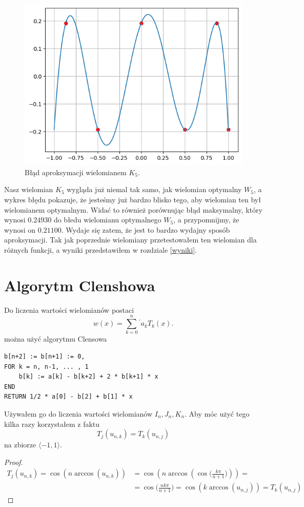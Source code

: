 \documentclass[11pt,wide]{mwart}
\begin{document}
\begin{figure}[H]
	\begin{center}
	\includegraphics[scale=0.7]{blad_K}
	\end{center}
	\caption{Błąd aproksymacji wielomianem $K_5$.}
\end{figure}
Nasz wielomian $K_5$ wygląda już niemal tak samo, jak wielomian optymalny $W_5$, a wykres błędu pokazuje, że jesteśmy już bardzo blisko tego, aby wielomian ten był wielomianem optymalnym. Widać to również porównując błąd maksymalny, który wynosi $0.24930$ do błedu wielomianu optymalnego $W_5$, a przypomnijmy, że wynosi on $0.21100$. Wydaje się zatem, że jest to bardzo wydajny sposób aproksymacji. Tak jak poprzednie wielomiany przetestowałem ten wielomian dla różnych funkcji, a wyniki przedstawiłem w rozdziale \ref{wyniki}.


\section{Algorytm Clenshowa}
Do liczenia wartości wielomianów postaci
$$ w(x) = \sum_{k=0}^n {}^{'} a_k T_k(x). $$
można użyć algorytmu Clensowa \cite{c1}
\begin{verbatim}
b[n+2] := b[n+1] := 0,
FOR k = n, n-1, ... , 1
    b[k] := a[k] - b[k+2] + 2 * b[k+1] * x
END
RETURN 1/2 * a[0] - b[2] + b[1] * x
\end{verbatim}
Używałem go do liczenia wartości wielomianów $I_n, J_n, K_n$. Aby móc użyć tego kilka razy korzystałem z faktu
\begin{equation}
T_j(u_{n, k}) = T_k(u_{n,j})
\end{equation}
na zbiorze $\langle -1, 1 \rangle$.
\begin{proof}
\begin{align*}
T_j(u_{n,k}) = \cos(n \arccos(u_{n,k})) &= \cos(n \arccos(\cos\Big(\frac{k\pi}{n+1}\Big))) = \\
&= \cos\Big(\frac{nk\pi}{n+1}\Big) = \cos(k \arccos(u_{n,j})) = T_k(u_{n,j})
\end{align*}
\end{proof}
\end{document}
